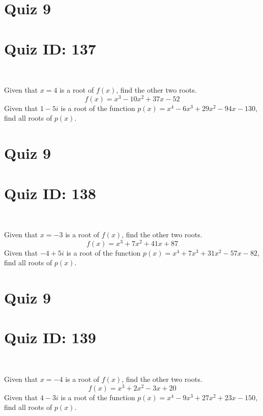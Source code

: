 \documentclass{exam}
\begin{document}
\section*{Quiz 9}
\section*{Quiz ID: 137}
\vspace{0.5cm}\
\vspace{1cm}\
\begin{questions}
\question Given that $x=4$ is a root of $f(x)$, find the other two roots.\[f(x)=
x^3 - 10x^2 + 37x - 52\]
\newpage
\question Given that $1-5\mathit{i}$ is a root of the function $p(x)=
x^4 - 6x^3 + 29x^2 - 94x - 130$, find all roots of $p(x)$. 
\end{questions}\newpage
\newpage
\section*{Quiz 9}
\section*{Quiz ID: 138}
\vspace{0.5cm}\
\vspace{1cm}\
\begin{questions}
\question Given that $x=-3$ is a root of $f(x)$, find the other two roots.\[f(x)=
x^3 + 7x^2 + 41x + 87\]
\newpage
\question Given that $-4+5\mathit{i}$ is a root of the function $p(x)=
x^4 + 7x^3 + 31x^2 - 57x - 82$, find all roots of $p(x)$. \makeemptybox{\stretch{1}}
\end{questions}\newpage
\newpage
\section*{Quiz 9}
\section*{Quiz ID: 139}
\vspace{0.5cm}\
\vspace{1cm}\
\begin{questions}
\question Given that $x=-4$ is a root of $f(x)$, find the other two roots.\[f(x)=
x^3 + 2x^2 - 3x + 20\]
\newpage
\question Given that $4-3\mathit{i}$ is a root of the function $p(x)=
x^4 - 9x^3 + 27x^2 + 23x - 150$, find all roots of $p(x)$. \makeemptybox{\stretch{1}}
\end{questions}\newpage
\end{document}
